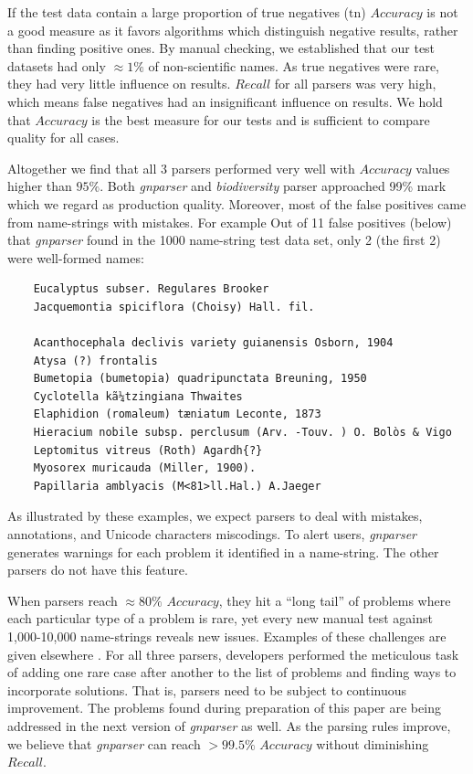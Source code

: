 \documentclass{bmcart}
\begin{document}
If the test data contain a large proportion of true negatives ($\text{tn}$) $Accuracy$
is not a good measure as it favors algorithms which distinguish negative
results, rather than finding positive ones. By manual checking, we established that our test datasets had only $\approx1\%$ of non-scientific names. As true
negatives were rare, they had very little influence on results. $Recall$ for all
parsers was very high, which means false negatives had an insignificant
influence on results. We hold that $Accuracy$ is the best measure for
our tests and is sufficient to compare quality for all cases.

Altogether we find that all 3 parsers performed very well with $Accuracy$
values higher than $95\%$. Both \textit{gnparser} and \textit{biodiversity}
parser approached 99\% mark which we regard as production
quality. Moreover, most of
the false positives came from name-strings with mistakes. For example Out of 11 false positives (below) that \textit{gnparser} found in the 1000 name-string test data set, only 2 (the first 2) were well-formed names:

\vspace{0.5cm}

\begin{verbatim}
    Eucalyptus subser. Regulares Brooker
    Jacquemontia spiciflora (Choisy) Hall. fil.

    Acanthocephala declivis variety guianensis Osborn, 1904
    Atysa (?) frontalis
    Bumetopia (bumetopia) quadripunctata Breuning, 1950
    Cyclotella kã¼tzingiana Thwaites
    Elaphidion (romaleum) tæniatum Leconte, 1873
    Hieracium nobile subsp. perclusum (Arv. -Touv. ) O. Bolòs & Vigo
    Leptomitus vitreus (Roth) Agardh{?}
    Myosorex muricauda (Miller, 1900).
    Papillaria amblyacis (M<81>ll.Hal.) A.Jaeger
\end{verbatim}

\vspace{0.5cm}

As illustrated by these examples, we expect parsers to deal with
mistakes, annotations, and Unicode characters miscodings. To alert users,
\textit{gnparser} generates warnings for each problem it identified in a name-string. The other parsers do not have this feature.

When parsers reach $\approx80\%$ $Accuracy$, they hit a ``long tail'' of
problems where each particular type of a problem is rare, yet every new manual
test against 1,000-10,000 name-strings reveals new issues.  Examples of these
challenges are given elsewhere \cite{Patterson:inpress-a}. For all three
parsers, developers performed the meticulous task of adding one rare case after
another to the list of problems and finding ways to incorporate solutions. That
is, parsers need to be subject to continuous improvement. The problems found
during preparation of this paper are being addressed in the next version of
\textit{gnparser} as well. As the parsing rules improve, we believe that
\textit{gnparser} can reach $>99.5\%$ $Accuracy$ without diminishing $Recall$.
\end{document}

